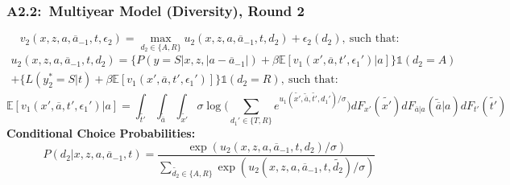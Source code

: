 \documentclass[12pt, aspectratio=169]{beamer}
\begin{document}
\begin{frame}[label=mmdr2]
\frametitle{A2.2:\ Multiyear Model (Diversity), Round 2}
\begin{equation*}
v_2(x,z,a,\overline{a}_{-1},t,\epsilon_2) = \max_{d_2\in\{A,R\}}u_2(x,z,a,\overline{a}_{-1},t,d_2)+\epsilon_2(d_2), \: \text{such that:}
\end{equation*}
\begin{multline*}
u_2(x,z,a,\overline{a}_{-1},t,d_2) = \{P(y=S|x,z,|a-\overline{a}_{-1}|)+\beta\mathbb{E}[v_1(x',\overline{a},t',\epsilon_1')|a]\}\mathds{1}(d_2=A) \\
+\{L(y_2^*=S|t)+\beta\mathbb{E}[v_1(x',\overline{a},t',\epsilon_1')]\}\mathds{1}(d_2=R), \: \text{such that:}
\end{multline*}
\begin{equation*}
\mathbb{E}[v_1(x',\overline{a},t',\epsilon_1')|a] = \int_{\widetilde{t'}}\int_{\widetilde{\overline{a}}}\int_{\widetilde{x'}}\sigma\log\bigg(\sum_{d_1'\in\{T,R\}}e^{u_1(\widetilde{x'},\widetilde{\overline{a}},\widetilde{t'},d_1')/\sigma}\bigg)dF_{x'}(\widetilde{x'})dF_{\overline{a}|a}(\widetilde{\overline{a}}|a)dF_{t'}(\widetilde{t'})
\end{equation*}
\textbf{Conditional Choice Probabilities:}
\begin{equation*}
P(d_2|x,z,a,\overline{a}_{-1},t) = \frac{\exp(u_2(x,z,a,\overline{a}_{-1},t,d_2)/\sigma)}{\sum_{\widetilde{d_2}\in\{A,R\}}\exp(u_2(x,z,a,\overline{a}_{-1},t,\widetilde{d_2})/\sigma)}
\end{equation*}
\hyperlink{conc}{}
\end{frame}
\end{document}
